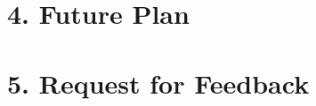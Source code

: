 \documentclass[11pt, a4paper, twoside, openright]{report}
\begin{document}


\section*{4. Future Plan}


\section*{5. Request for Feedback}



\backmatter{}

%


\end{document}
